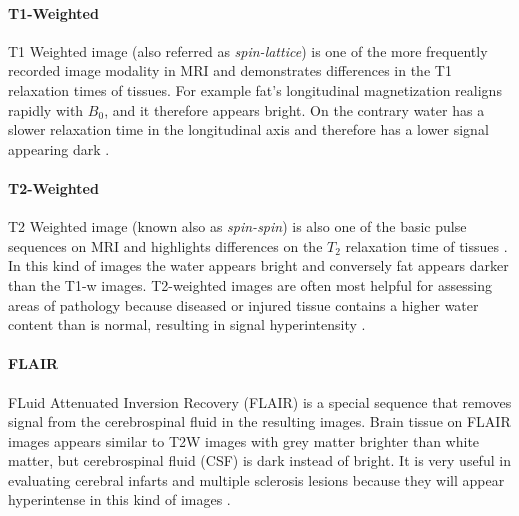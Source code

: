 \documentclass{standalone}
\begin{document}
\paragraph{T1-Weighted}
T1 Weighted image (also referred as \textit{spin-lattice}) is one of the more frequently recorded image modality in MRI and demonstrates differences in the T1 relaxation times of tissues. For example fat's longitudinal magnetization realigns rapidly  with $B_0$, and it therefore appears bright. On the contrary water has a slower relaxation time in the longitudinal axis and therefore has a lower signal appearing dark \cite{T1}.

\paragraph{T2-Weighted}
T2 Weighted image (known also as \textit{spin-spin}) is also one of the basic pulse sequences on MRI and highlights differences on the $T_2$ relaxation time of tissues \cite{T2}.
In this kind of images the water appears bright and conversely fat appears darker than the T1-w images.
T2-weighted images are often most helpful for assessing areas of pathology because diseased or injured tissue contains a higher water content than is normal, resulting in signal hyperintensity \cite{ART:Finkelstein}.

\paragraph{FLAIR}
FLuid Attenuated Inversion Recovery (FLAIR) is a special sequence that removes signal from the cerebrospinal fluid in the resulting images. Brain tissue on FLAIR images appears similar to T2W images with grey matter brighter than white matter, but cerebrospinal fluid (CSF) is dark instead of bright.
It is very useful in evaluating cerebral infarts and multiple sclerosis lesions because they will appear hyperintense in this kind of images \cite{FLAIR}.
\end{document}
